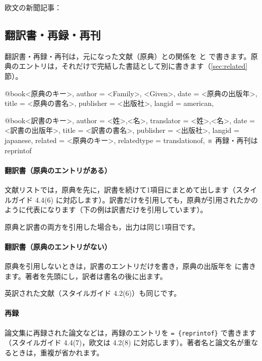 
欧文の新聞記事：


\subsection{翻訳書・再録・再刊}\label{sec:trans}
翻訳書・再録・再刊は，元になった文献（原典）との関係を  と  で書きます。原典のエントリは，それだけで完結した書誌として別に書きます（\ref{sec:related}節）。

\begin{bibtemplate}
@book{<原典のキー>,
  author    = {<Family>, <Given>},
  date      = {<原典の出版年>},
  title     = {<原典の書名>},
  publisher = {<出版社>},
  langid    = {american},
}

@book{<訳書のキー>,
  author      = {<姓>,<名>},
  translator  = {<姓>,<名>},
  date        = {<訳書の出版年>},
  title       = {<訳書の書名>},
  publisher   = {<出版社>},
  langid      = {japanese},
  related     = {<原典のキー>},
  relatedtype = {translationof},   ※ 再録・再刊は reprintof
}
\end{bibtemplate}

\paragraph{翻訳書（原典のエントリがある）}
文献リストでは，原典を先に，訳書を続けて1項目にまとめて出します（スタイルガイド 4.4(6) に対応します）。訳書だけを引用しても，原典が引用されたかのように代表になります（下の例は訳書だけを引用しています）。


原典と訳書の両方を引用した場合も，出力は同じ1項目です。


\paragraph{翻訳書（原典のエントリがない）}
原典を引用しないときは，訳書のエントリだけを書き，原典の出版年を  に書きます。著者を先頭にし，訳者は書名の後に出ます。


英訳された文献（スタイルガイド 4.2(6)）も同じです。


\paragraph{再録}
論文集に再録された論文などは，再録のエントリを  \texttt{= \{reprintof\}} で書きます（スタイルガイド 4.4(7)，欧文は 4.2(8) に対応します）。著者名と論文名が重なるときは，重複が省かれます。

